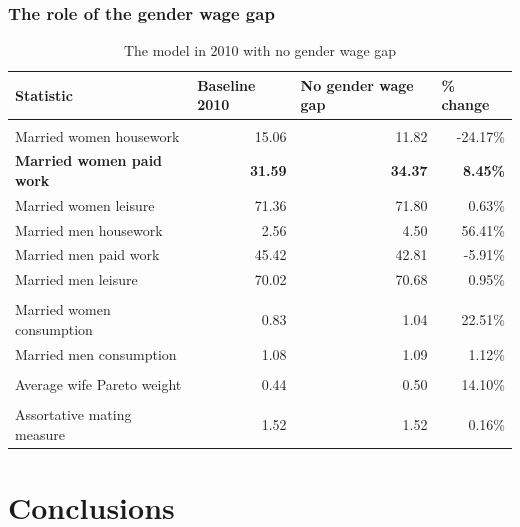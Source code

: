 \documentclass{beamer}
\begin{document}
\begin{frame}
	\frametitle{The role of the gender wage gap}
	\scriptsize
	\begin{table}[htbp]
		\centering
		\caption{The model in 2010 with no gender wage gap}
		\begin{tabular}{lrrr}
			\toprule
			Statistic & \multicolumn{1}{l}{Baseline 2010} & \multicolumn{1}{l}{No gender wage gap} & \multicolumn{1}{l}{\% change} \\
			\midrule
			&       &       &  \\
			Married women housework & 15.06 & 11.82 & -24.17\% \\
			\textcolor[rgb]{ 1,  0,  0}{\textbf{Married women paid work}} & \textcolor[rgb]{ 1,  0,  0}{\textbf{31.59}} & \textcolor[rgb]{ 1,  0,  0}{\textbf{34.37}} & \textcolor[rgb]{ 1,  0,  0}{\textbf{8.45\%}} \\
			Married women leisure & 71.36 & 71.80 & 0.63\% \\
			Married men housework & 2.56  & 4.50  & 56.41\% \\
			Married men paid work & 45.42 & 42.81 & -5.91\% \\
			Married men leisure & 70.02 & 70.68 & 0.95\% \\
			&       &       &  \\
			Married women consumption & 0.83  & 1.04  & 22.51\% \\
			Married men consumption & 1.08  & 1.09  & 1.12\% \\
			&       &       &  \\
			Average wife Pareto weight & 0.44  & 0.50  & 14.10\% \\
			&       &       &  \\
			Assortative mating measure & 1.52  & 1.52  & 0.16\% \\
			\bottomrule
			\bottomrule
		\end{tabular}
	\end{table}
\end{frame}

\section{Conclusions}
\end{document}
